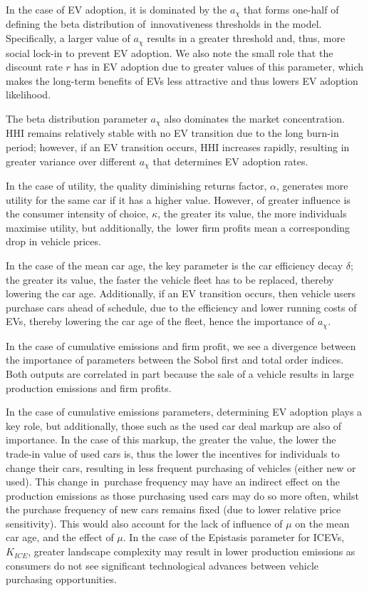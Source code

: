 \documentclass[12pt]{article}
\begin{document}
	In the case of EV adoption, it is dominated by the $a_{\chi}$ that forms one-half of defining the beta distribution of innovativeness thresholds in the model. Specifically, a larger value of $a_{\chi}$ results in a greater threshold and, thus, more social lock-in to prevent EV adoption. We also note the small role that the discount rate $r$ has in EV adoption due to greater values of this parameter, which makes the long-term benefits of EVs less attractive and thus lowers EV adoption likelihood. 
	
	The beta distribution parameter $a_{\chi}$ also dominates the market concentration. HHI remains relatively stable with no EV transition due to the long burn-in period; however, if an EV transition occurs, HHI increases rapidly, resulting in greater variance over different $a_{\chi}$ that determines EV adoption rates. 
	
	In the case of utility, the quality diminishing returns factor, $\alpha$, generates more utility for the same car if it has a higher value. However, of greater influence is the consumer intensity of choice, $\kappa$, the greater its value, the more individuals maximise utility, but additionally, the lower firm profits mean a corresponding drop in vehicle prices.
	
	In the case of the mean car age, the key parameter is the car efficiency decay $\delta$; the greater its value, the faster the vehicle fleet has to be replaced, thereby lowering the car age. Additionally, if an EV transition occurs, then vehicle users purchase cars ahead of schedule, due to the efficiency and lower running costs of EVs, thereby lowering the car age of the fleet, hence the importance of $a_\chi$. 
	
	In the case of cumulative emissions and firm profit, we see a divergence between the importance of parameters between the Sobol first and total order indices. Both outputs are correlated in part because the sale of a vehicle results in large production emissions and firm profits.
	
	In the case of cumulative emissions parameters, determining EV adoption plays a key role, but additionally, those such as the used car deal markup are also of importance. In the case of this markup, the greater the value, the lower the trade-in value of used cars is, thus the lower the incentives for individuals to change their cars, resulting in less frequent purchasing of vehicles (either new or used). This change in purchase frequency may have an indirect effect on the production emissions as those purchasing used cars may do so more often, whilst the purchase frequency of new cars remains fixed (due to lower relative price sensitivity). This would also account for the lack of influence of $\mu$ on the mean car age, and the effect of $\mu$. In the case of the Epistasis parameter for ICEVs, $K_{ICE}$, greater landscape complexity may result in lower production emissions as consumers do not see significant technological advances between vehicle purchasing opportunities. 
	
\end{document}
